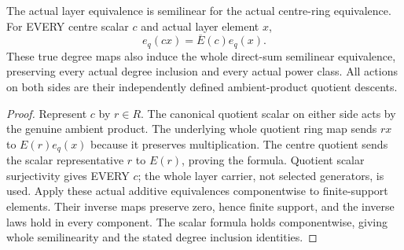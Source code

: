 \begin{lemma}
\label{hir:nonlinear-centre-canonical-scalars-and-whole-sum}
\leanok
The actual layer equivalence is semilinear for the actual centre-ring
equivalence. For EVERY centre scalar $c$ and actual layer element $x$,
\[
 e_q(cx)=\overline E(c)e_q(x).
\]
These true degree maps also induce the whole direct-sum semilinear
equivalence, preserving every actual degree inclusion and every actual
power class. All actions on both sides are their independently defined
ambient-product quotient descents.
\end{lemma}
\begin{proof}
Represent $c$ by $r\in R$. The canonical quotient scalar on either side
acts by the genuine ambient product. The underlying whole quotient ring
map sends $rx$ to $E(r)e_q(x)$ because it preserves multiplication.
The centre quotient sends the scalar representative $r$ to $E(r)$,
proving the formula. Quotient scalar surjectivity gives EVERY $c$; the
whole layer carrier, not selected generators, is used. Apply these actual
additive equivalences componentwise to finite-support elements. Their
inverse maps preserve zero, hence finite support, and the inverse laws
hold in every component. The scalar formula holds componentwise, giving
whole semilinearity and the stated degree inclusion identities.
\end{proof}

